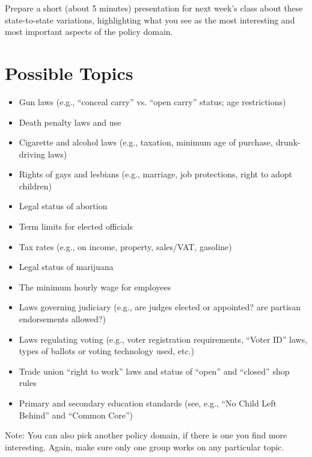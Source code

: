 \documentclass[a4, 12pt]{article}
\begin{document}
\vspace{1em}
\noindent Prepare a short (about 5 minutes) presentation for next week's class about these state-to-state variations, highlighting what you see as the most interesting and most important aspects of the policy domain.

\clearpage
\section*{Possible Topics}

\begin{itemize}\itemsep1em
\item Gun laws (e.g., ``conceal carry'' vs. ``open carry'' status; age restrictions)
\item Death penalty laws and use
\item Cigarette and alcohol laws (e.g., taxation, minimum age of purchase, drunk-driving laws) 
\item Rights of gays and lesbians (e.g., marriage, job protections, right to adopt children)
\item Legal status of abortion
\item Term limits for elected officials
\item Tax rates (e.g., on income, property, sales/VAT, gasoline)
\item Legal status of marijuana
\item The minimum hourly wage for employees
\item Laws governing judiciary (e.g., are judges elected or appointed? are partisan endorsements allowed?)
\item Laws regulating voting (e.g., voter registration requirements, ``Voter ID'' laws, types of ballots or voting technology used, etc.)
\item Trade union ``right to work'' laws and status of ``open'' and ``closed'' shop rules
\item Primary and secondary education standards (see, e.g., ``No Child Left Behind'' and ``Common Core'')
\end{itemize}

\vspace{1em}
\noindent Note: You can also pick another policy domain, if there is one you find more interesting. Again, make sure only one group works on any particular topic.
\end{document}
